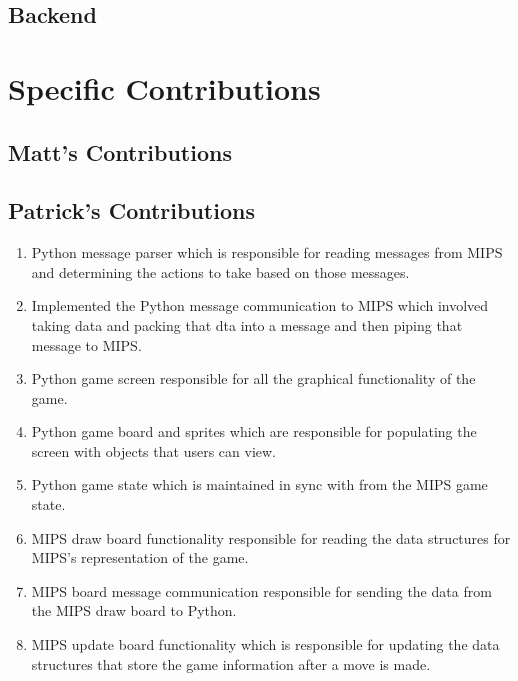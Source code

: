 \documentclass[]{article}
\begin{document}
\subsection*{Backend}

\section*{Specific Contributions}
\subsection*{Matt's Contributions}

\subsection*{Patrick's Contributions}
\begin{enumerate}
\item Python message parser which is responsible for reading messages from MIPS and determining the actions to take based on those messages.

\item Implemented the Python message communication to MIPS which involved taking data and packing that dta into a message and then piping that message to MIPS. 

\item Python game screen responsible for all the graphical functionality of the game.

\item Python game board and sprites which are responsible for populating the screen with objects that users can view.

\item Python game state which is maintained in sync with from the MIPS game state.

\item MIPS draw board functionality responsible for reading the data structures for MIPS's representation of the game.

\item MIPS board message communication responsible for sending the data from the MIPS draw board to Python.

\item MIPS update board functionality which is responsible for updating the data structures that store the game information after a move is made.
\end{enumerate}
\end{document}
